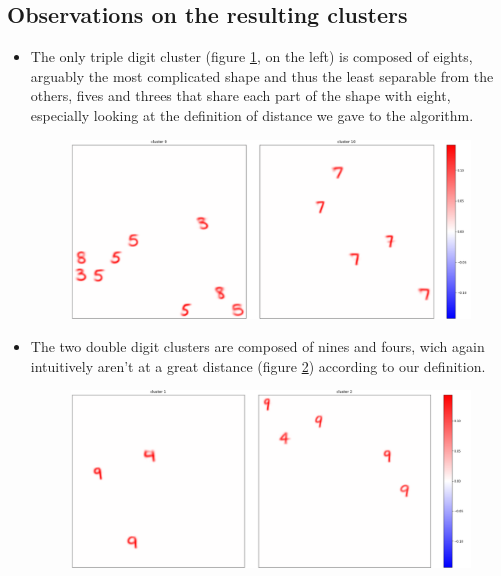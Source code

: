 \documentclass[a4paper]{report}
\begin{document}
\subsection{Observations on the resulting clusters}

\begin{itemize}
    \item The only triple digit cluster (figure \ref{910}, on the left) is composed of eights, arguably the most complicated shape and thus the least separable from the others, fives and threes that share each part of the shape with eight, especially looking at the definition of distance we gave to the algorithm.
    
\begin{figure} [H]
    \centering
    \includegraphics [width=\textwidth ] {c/h/9.png}
    \caption{}
    \label{910}
\end{figure}

    \item The two double digit clusters are composed of nines and fours, wich again intuitively aren't at a great distance (figure \ref{12}) according to our definition.

\begin{figure} [H]
    \centering
    \includegraphics [width=\textwidth ] {c/h/1.png}
    \caption{}
    \label{12}
\end{figure}
    

\end{itemize}
\end{document}
